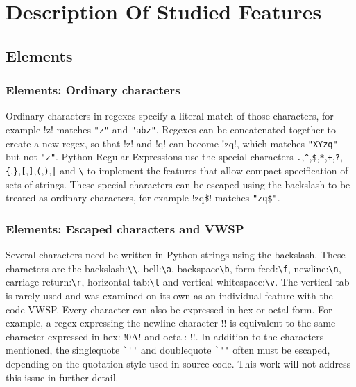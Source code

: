 \section*{Description Of Studied Features}
\label{sec:featureDescriptions}

\subsection*{Elements}

\subsubsection*{Elements: Ordinary characters}

Ordinary characters in regexes specify a literal match of those characters, for example \cverb!z! matches \verb!"z"! and \verb!"abz"!.  Regexes can be concatenated together to create a new regex, so that \cverb!z! and \cverb!q! can become \cverb!zq!, which matches \verb!"XYzq"! but not \verb!"z"!.  Python Regular Expressions use the special characters \verb!.!,\verb!^!,\verb!$!,\verb!*!,\verb!+!,\verb!?!,\verb!{!,\verb!}!,\verb![!,\verb!]!,\verb!(!,\verb!)!,\verb!|! and \verb!\! to implement the features that allow compact specification of sets of strings.  These special characters can be escaped using the backslash to be treated as ordinary characters, for example \cverb!zq\$! matches \verb!"zq$"!.

\subsubsection*{Elements: Escaped characters and VWSP}

Several characters need be written in Python strings using the backslash.  These characters are the backslash:\verb!\\!, bell:\verb!\a!, backspace\verb!\b!, form feed:\verb!\f!, newline:\verb!\n!, carriage return:\verb!\r!, horizontal tab:\verb!\t! and vertical whitespace:\verb!\v!.  The vertical tab is rarely used and was examined on its own as an individual feature with the code VWSP.  Every character can also be expressed in hex or octal form.  For example, a regex expressing the newline character \cverb!\n! is equivalent to the same character expressed in hex: \cverb!\x0A! and octal: \cverb!!.  In addition to the characters mentioned, the singlequote \verb!`''! and doublequote \verb!`"'! often must be escaped, depending on the quotation style used in source code.  This work will not address this issue in further detail.

